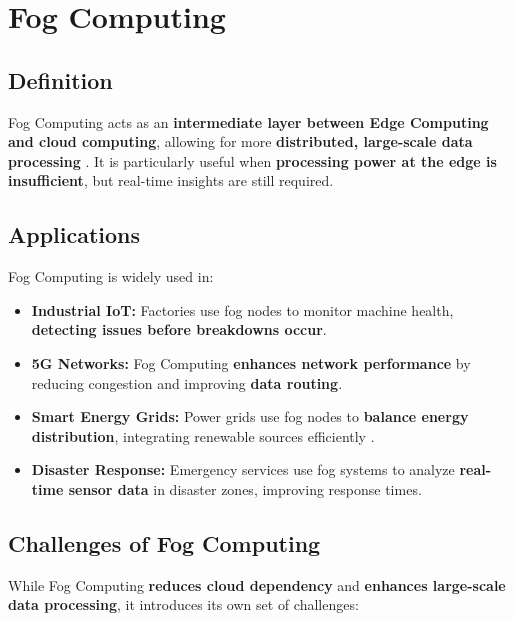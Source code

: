 \documentclass[a4paper,12pt]{article}
\begin{document}
	\section{Fog Computing}
	\subsection{Definition}
	Fog Computing acts as an \textbf{intermediate layer between Edge Computing and cloud computing}, allowing for more \textbf{distributed, large-scale data processing} \cite{bonomi2012fog}. It is particularly useful when \textbf{processing power at the edge is insufficient}, but real-time insights are still required.
	
	\subsection{Applications}
	Fog Computing is widely used in:
	\begin{itemize}
		\item \textbf{Industrial IoT:} Factories use fog nodes to monitor machine health, \textbf{detecting issues before breakdowns occur}.
		\item \textbf{5G Networks:} Fog Computing \textbf{enhances network performance} by reducing congestion and improving \textbf{data routing}.
		\item \textbf{Smart Energy Grids:} Power grids use fog nodes to \textbf{balance energy distribution}, integrating renewable sources efficiently \cite{cisco2015fog}.
		\item \textbf{Disaster Response:} Emergency services use fog systems to analyze \textbf{real-time sensor data} in disaster zones, improving response times.
	\end{itemize}
	
	\subsection{Challenges of Fog Computing}
	While Fog Computing \textbf{reduces cloud dependency} and \textbf{enhances large-scale data processing}, it introduces its own set of challenges:
	
\end{document}
